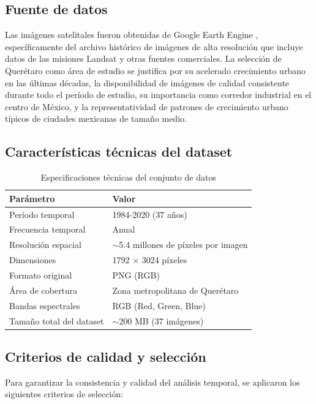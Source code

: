 \subsection{Fuente de datos}

Las imágenes satelitales fueron obtenidas de Google Earth Engine \parencite{Gorelick2017}, específicamente del archivo histórico de imágenes de alta resolución que incluye datos de las misiones Landsat y otras fuentes comerciales. La selección de Querétaro como área de estudio se justifica por su acelerado crecimiento urbano en las últimas décadas, la disponibilidad de imágenes de calidad consistente durante todo el período de estudio, su importancia como corredor industrial en el centro de México, y la representatividad de patrones de crecimiento urbano típicos de ciudades mexicanas de tamaño medio.

\subsection{Características técnicas del dataset}

\begin{table}[h]
\centering
\caption{Especificaciones técnicas del conjunto de datos}
\begin{tabular}{|l|l|}
\hline
	\textbf{Parámetro} & \textbf{Valor} \\
\hline
Período temporal & 1984-2020 (37 años) \\
Frecuencia temporal & Anual \\
Resolución espacial & $\sim$5.4 millones de píxeles por imagen \\
Dimensiones & 1792 × 3024 píxeles \\
Formato original & PNG (RGB) \\
Área de cobertura & Zona metropolitana de Querétaro \\
Bandas espectrales & RGB (Red, Green, Blue) \\
Tamaño total del dataset & $\sim$200 MB (37 imágenes) \\
\hline
\end{tabular}
\label{tab:dataset_specs}
\end{table}

\subsection{Criterios de calidad y selección}

Para garantizar la consistencia y calidad del análisis temporal, se aplicaron los siguientes criterios de selección:

